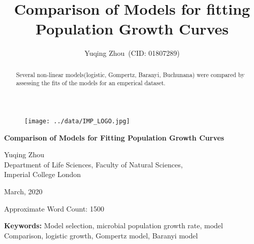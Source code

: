 \documentclass[a4paper,11pt]{article}
\theoremstyle{definition}
\newcommand{\ReportAuthor}{Yuqing Zhou}
\newcommand{\ReportAffil}{Department of Life Sciences, Faculty of Natural Sciences,\\Imperial College London}
\newcommand{\ReportTitle}{Comparison of Models for Fitting Population Growth Curves}
\begin{document}
    \begin{titlepage}
        \vspace{10pt}
        \begin{figure}[!ht]
            \centering
                \begin{center}
                     \texttt{[image: ../data/IMP\_LOGO.jpg]}
                \end{center}
        \end{figure}

        \vspace{5pt}
    	\begin{center}
            \Huge\textbf{\ReportTitle}\\
        \end{center}
        
        \begin{center}
        \vspace{\fill}
            \LARGE\ReportAuthor\\
		    \vspace{6pt}
            \Large\ReportAffil
        \end{center}
        	
        \begin{center}
        \vspace{\fill}
    	    \normalsize{March, 2020}
        \end{center}       
        \begin{flushright}
		    \normalsize Approximate Word Count: 1500%
	    \end{flushright}
    \end{titlepage}
    

\title{Comparison of Models for fitting Population Growth Curves}
\author{Yuqing Zhou\ (CID: 01807289)}

\date{}
\maketitle
\linenumbers
\begin{abstract}
Several non-linear models(logistic, Gompertz, Baranyi, Buchunana) were compared by assessing the fits of the models for an emperical dataset.
\end{abstract}
\textbf{Keywords:} Model selection, microbial population growth rate, model Comparison, logistic growth, Gompertz model, Baranyi model
\end{document}
